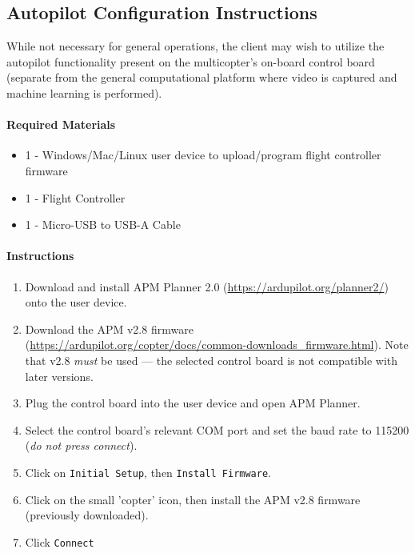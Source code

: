 \documentclass[10pt,letterpaper]{article}
\begin{document}
\subsection{Autopilot Configuration Instructions}
While not necessary for general operations, the client may wish to utilize the autopilot functionality present on the multicopter's on-board control board (separate from the general computational platform where video is captured and machine learning is performed).


\paragraph{Required Materials}
\begin{itemize}
\item 1 - Windows/Mac/Linux user device to upload/program flight controller firmware
\item 1 - Flight Controller
\item 1 - Micro-USB to USB-A Cable
\end{itemize}

\paragraph{Instructions}

\begin{enumerate}
\item Download and install APM Planner 2.0 (\url{https://ardupilot.org/planner2/}) onto the user device.
\item Download the APM v2.8 firmware (\url{https://ardupilot.org/copter/docs/common-downloads_firmware.html}). Note that v2.8 \textit{must} be used --- the selected control board is not compatible with later versions.
\item Plug the control board into the user device and open APM Planner.
\item Select the control board's relevant COM port and set the baud rate to 115200 (\textit{do not press connect}).
\item Click on \texttt{Initial Setup}, then \texttt{Install Firmware}.
\item Click on the small 'copter' icon, then install the APM v2.8 firmware (previously downloaded).
\item Click \texttt{Connect}
\end{enumerate}
\end{document}

